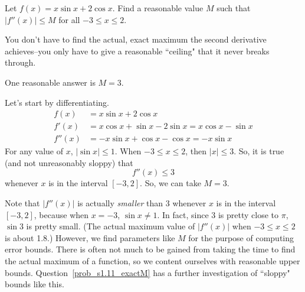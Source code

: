 \begin{question}\label{prob_s1.11_approxM}
Let $f(x) = x\sin x+2\cos x$.
 Find a reasonable value $M$ such that $|f''(x)| \leq M$ for all $-3 \leq x \leq 2$.
\end{question}
\begin{hint}
You don't have to find the actual, exact maximum the second derivative achieves--you only have to give a reasonable ``ceiling" that it never breaks through.
\end{hint}
\begin{answer}
One reasonable answer is $M=3$.
\end{answer}
\begin{solution}
Let's start by differentiating.
\begin{align*}
f(x)&=x\sin x +2\cos x\\
f'(x)&=x\cos x + \sin x - 2\sin x =x\cos x - \sin x\\
f''(x)&=-x\sin x + \cos x -\cos x = -x\sin x
\end{align*}
For any value of $x$, $|\sin x| \leq 1$. When $-3 \leq x \leq 2$, then $|x| \leq 3$. So, it is true (and not unreasonably sloppy) that
\[f''(x) \leq 3\]
whenever $x$ is in the interval $[-3,2]$. So, we can take $M=3$.

Note that $|f''(x)|$ is actually \emph{smaller} than 3 whenever $x$ is in the interval $[-3,2]$, because when $x=-3$, $\sin x \neq 1$. In fact, since 3 is pretty close to $\pi$, $\sin 3$ is pretty small. (The actual maximum value of $|f''(x)|$ when $-3\leq x\leq 2$ is about 1.8.) However, we find  parameters like $M$ for the purpose of computing error bounds. There is often not much to be gained from taking the time to find the actual maximum of a function, so we content ourselves with reasonable upper bounds.
Question~\ref{prob_s1.11_exactM} has a further investigation of ``sloppy" bounds like this.
\end{solution}


